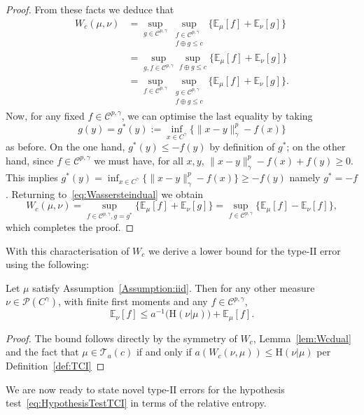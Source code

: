 \documentclass[twoside,11pt]{article}
\numberwithin{equation}{section}
\numberwithin{theorem}{section}
\newcommand{\ex}{\mathbb{E}}
\newcommand{\Cc}{\mathscr{C}}
\newcommand{\Hent}{\boldsymbol{\mathrm{H}}}
\begin{document}
\begin{proof}
From these facts we deduce that 
\begin{equation}\label{eq:Wassersteindual}
\begin{aligned}
W_c(\mu,\nu)
&=\sup_{g\in\mathscr{C}^{p,\gamma}}\sup_{\substack{f\in\mathscr{C}^{p,\gamma}\\ f\oplus g\leq c}} \bigg\{ \ex_\mu[f]+\ex_\nu[g]  \bigg\}\\
& = \sup_{g, f\in \Cc^{p,\gamma}}\sup_{f\oplus g\leq c} \bigg\{ \ex_\mu[f]+\ex_\nu[g]  \bigg\}\\
&=\sup_{f\in\mathscr{C}^{p,\gamma}}\sup_{\substack{g\in\mathscr{C}^{p,\gamma}\\ f\oplus g\leq c}}  \bigg\{ \ex_\mu[f]+\ex_\nu[g]  \bigg\}.
\end{aligned}
\end{equation}
Now, for any fixed $f\in \Cc^{p,\gamma}$, we can optimise the last equality by taking $$
g(y)=g^*(y):=\inf_{x\in C^\gamma}\{ \|x-y\|^p_\gamma-f(x)      \}
$$ as before. 
On the one hand, 
$g^*(y)\leq -f(y)$ by definition of $g^*$;
on the other hand, since $f\in \Cc^{p,\gamma}$ we must have, for all $x,y$, 
$\|x-y\|^p_\gamma-f(x)+f(y)\geq 0$. This implies
$g^*(y)=\inf_{x\in C^\gamma}\{ \|x-y\|^p_\gamma-f(x)      \}\geq -f(y)$
namely $g^*=-f$.
Returning to~\eqref{eq:Wassersteindual} we obtain
$$
W_c(\mu,\nu)=  \sup_{f\in \Cc^{p,\gamma}, g=g^*} \bigg\{ \ex_\mu[f]+\ex_\nu[g]  \bigg\} = \sup_{f\in \Cc^{p,\gamma}} \bigg\{ \ex_\mu[f]-\ex_\nu[f]  \bigg\},$$
which completes the proof.
\end{proof}

\noindent With this characterisation of $W_c$ we derive a lower bound for the type-$\mathrm{II}$ error using the following:
\begin{corollary}\label{cor:momentBound} 
Let $\mu$ satisfy Assumption~\ref{Assumption:iid}. Then for any other measure $\nu\in\mathscr{P}(C^\gamma)$, with finite first moments and any $f\in \Cc^{p,\gamma}$,
$$
\ex_\nu[f]\leq a^{-1}\bigg(  \Hent(\nu|\mu)   \bigg)+\ex_\mu[f].
$$
\end{corollary}
\begin{proof} The bound follows directly by the symmetry of $W_c$, Lemma~\ref{lem:Wcdual} and the fact that $\mu\in\mathscr{T}_a(c)$ if and only if $a(W_c(\nu, \mu))\leq \Hent(\nu|\mu)$ per Definition~\ref{def:TCI}
\end{proof}

We are now ready to state novel type-$\mathrm{II}$ errors for the hypothesis test~\eqref{eq:HypothesisTestTCI} in terms of the relative entropy.
\end{document}
